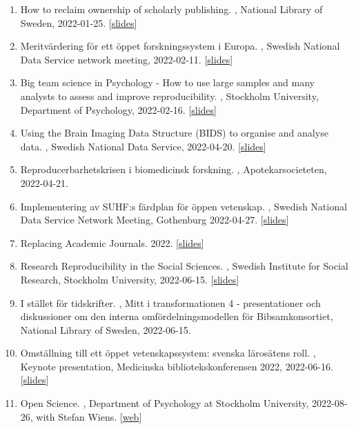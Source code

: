 \documentclass[10pt,a4paper,twocolumn]{article}
\begin{document}
\begin{enumerate}
    \item How to reclaim ownership of scholarly publishing. , National Library of Sweden, 2022-01-25. [\href{https://osf.io/rc82z/}{slides}]

    \item Meritvärdering för ett öppet forskningssystem i Europa. , Swedish National Data Service network meeting, 2022-02-11. [\href{https://osf.io/dqyp3/}{slides}]

    \item Big team science in Psychology - How to use large samples and many analysts to assess and improve reproducibility. , Stockholm University, Department of Psychology, 2022-02-16. [\href{https://osf.io/b3wh6/}{slides}]

    \item Using the Brain Imaging Data Structure (BIDS) to organise and analyse data. , Swedish National Data Service, 2022-04-20. [\href{https://osf.io/4rtcx/}{slides}]

    \item Reproducerbarhetskrisen i biomedicinsk forskning. , Apotekarsocieteten, 2022-04-21.

    \item Implementering av SUHF:s färdplan för öppen vetenskap. , Swedish National Data Service Network Meeting, Gothenburg 2022-04-27. [\href{https://osf.io/xf9nk/}{slides}]

    \item Replacing Academic Journals. 2022. [\href{https://osf.io/amz5w/}{slides}]

    \item Research Reproducibility in the Social Sciences. , Swedish Institute for Social Research, Stockholm University, 2022-06-15. [\href{https://osf.io/zvm7p/}{slides}]

    \item I stället för tidskrifter. , Mitt i transformationen 4 - presentationer och diskussioner om den interna omfördelningsmodellen för Bibsamkonsortiet, National Library of Sweden, 2022-06-15.

    \item Omställning till ett öppet vetenskapssystem: svenska lärosätens roll. , Keynote presentation, Medicinska bibliotekskonferensen 2022, 2022-06-16. [\href{https://osf.io/zvyqa/}{slides}]

    \item Open Science. , Department of Psychology at Stockholm University, 2022-08-26, with Stefan Wiens. [\href{https://stefanwiens.github.io/open_science_talk/openscience.html}{web}]


\end{enumerate}
\end{document}

